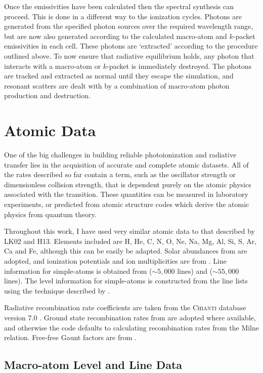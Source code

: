 Once the emissivities have been calculated then the spectral synthesis can proceed.
This is done in a different way to the ionization cycles. Photons 
are generated from the specified photon sources over the required wavelength range,
but are now also generated according to the calculated macro-atom and 
$k$-packet emissivities in each cell. These photons are `extracted' according
to the procedure outlined above.
To now ensure that radiative equilibrium 
holds, any photon that interacts with a macro-atom or $k$-packet is immediately 
destroyed. The photons are tracked and extracted as normal until they escape the 
simulation, and resonant scatters are dealt with by a combination of
macro-atom photon production and destruction.

\section{Atomic Data}
\label{sec:atomic_data}
One of the big challenges in building reliable photoionization and radiative
transfer lies in the acquisition of accurate and complete atomic datasets.
All of the rates described so far contain a term, such as the oscillator strength 
or dimensionless collision strength, that is dependent purely on the atomic physics
associated with the transition. These quantities can be measured in laboratory experiments,
or predicted from atomic structure codes which derive the atomic physics from 
quantum theory.

Throughout this work, I have used very similar atomic data to that described 
by LK02 and H13. Elements included are H, He, C, N, O, Ne, Na, Mg, Al, Si, S,
Ar, Ca and Fe, although this can be easily be adapted. Solar abundances from
\cite{vernerbarthel1994} are adopted, and ionization potentials and ion
multiplicities are from \cite{verner1996}. Line information for simple-atoms 
is obtained from \citep{verner1996} ($\sim5,000$ lines) and \citep{kurucz1995} 
($\sim55,000$ lines). The level information for simple-atoms is constructed 
from the line lists using the technique described by \cite{lucy1999sn}.

Radiative recombination rate coefficients are taken from 
the \textsc{Chianti} database version 7.0 \citep{dere1997,landi2012}.
Ground state recombination rates from \cite{badnell2006} are adopted where available,
and otherwise the code defaults to calculating recombination rates from the Milne
relation. Free-free Gaunt factors are from \cite{sutherland1998}.

\subsection{Macro-atom Level and Line Data}


